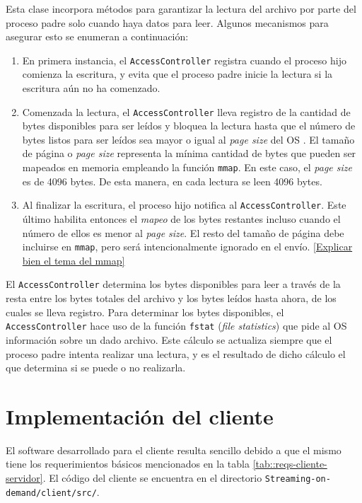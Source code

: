 \documentclass[../../main.tex]{subfiles}
\begin{document}
Esta clase incorpora métodos para garantizar la lectura del archivo por parte del proceso padre solo cuando haya datos para leer. Algunos mecanismos para asegurar esto se enumeran a continuación:
\begin{enumerate}
    \item En primera instancia, el \texttt{AccessController} registra cuando el proceso hijo comienza la escritura, y evita que el proceso padre inicie la lectura si la escritura aún no ha comenzado.
    \item Comenzada la lectura, el \texttt{AccessController} lleva registro de la cantidad de bytes disponibles para ser leídos y bloquea la lectura hasta que el número de bytes listos para ser leídos sea mayor o igual al \textit{page size} del OS . El tamaño de página o \textit{page size} representa la mínima cantidad de bytes que pueden ser mapeados en memoria empleando la función \texttt{mmap}. En este caso, el \textit{page size} es de 4096 bytes. De esta manera, en cada lectura se leen 4096 bytes.
    \item Al finalizar la escritura, el proceso hijo notifica al \texttt{AccessController}. Este último habilita entonces el \textit{mapeo} de los bytes restantes incluso cuando el número de ellos es menor al \textit{page size}. El resto del tamaño de página debe incluirse en \texttt{mmap}, pero será intencionalmente ignorado en el envío. \ref{Explicar bien el tema del mmap}
\end{enumerate}

El \texttt{AccessController} determina los bytes disponibles para leer a través de la resta entre los bytes totales del archivo y los bytes leídos hasta ahora, de los cuales se lleva registro. Para determinar los bytes disponibles, el \texttt{AccessController} hace uso de la función \texttt{fstat}  (\textit{file statistics}) que pide al OS información sobre un dado archivo. Este cálculo se actualiza siempre que el proceso padre intenta realizar una lectura, y es el resultado de dicho cálculo el que determina si se puede o no realizarla.

\section{Implementación del cliente}\label{sec::implementacion-cliente}
El software desarrollado para el cliente resulta sencillo debido a que el mismo tiene los requerimientos básicos mencionados en la tabla \ref{tab::reqs-cliente-servidor}. El código del cliente se encuentra en el directorio \texttt{Streaming-on-demand/client/src/}.
\end{document}
